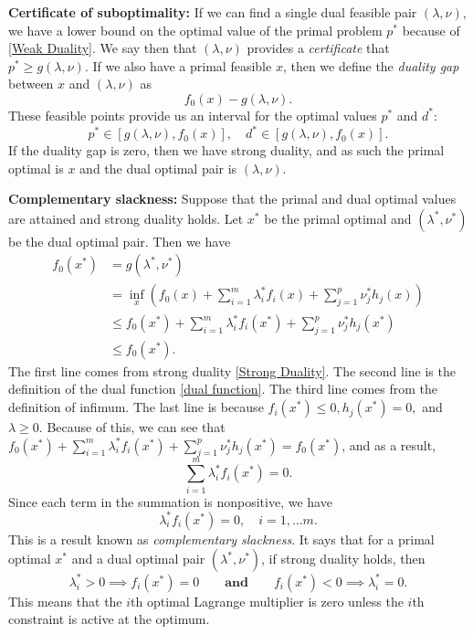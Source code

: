 	\textbf{Certificate of suboptimality:} If we can find a single dual feasible pair $(\lambda, \nu)$, we have a lower bound on the optimal value of the primal problem $p^*$ because of \eqref{Weak Duality}. We say then that $(\lambda, \nu)$ provides a \emph{certificate} that $p^* \geq g(\lambda, \nu)$. If we also have a primal feasible $x$, then we define the \emph{duality gap} between $x$ and $(\lambda, \nu)$ as
	$$
		f_0 (x) - g(\lambda, \nu).
	$$	
	These feasible points provide us an interval for the optimal values $p^*$ and $d^*$:
	$$
		p^* \in [g(\lambda, \nu), f_0 (x)], \quad d^* \in [g(\lambda, \nu), f_0 (x)].
	$$
	If the duality gap is zero, then we have strong duality, and as such the primal optimal is $x$ and the dual optimal pair is $(\lambda, \nu)$. 
	
	\textbf{Complementary slackness:} Suppose that the primal and dual optimal values are attained and strong duality holds. Let $x^*$ be the primal optimal and $(\lambda^*, \nu^*)$ be the dual optimal pair. Then we have 
	$$
	\begin{aligned}
		f_0 (x^*) &= g(\lambda^*, \nu^*)\\
		&= \inf_{x} \left( f_0 (x) + \sum_{i=1}^{m} \lambda_i^* f_i (x) + \sum_{j = 1}^{p} \nu_j^* h_j (x) \right)\\
		& \leq f_0 (x^*) + \sum_{i=1}^{m} \lambda_i^* f_i (x^*) + \sum_{j = 1}^{p} \nu_j^* h_j (x^*)\\
		& \leq f_0 (x^*).
	\end{aligned}
	$$
	The first line comes from strong duality \eqref{Strong Duality}. The second line is the definition of the dual function \eqref{dual function}. The third line comes from the definition of infimum. The last line is because $f_i (x^*) \leq 0, h_j (x^*) = 0, $ and $\lambda \geq  0$. Because of this, we can see that $f_0 (x^*) + \sum_{i=1}^{m} \lambda_i^* f_i (x^*) + \sum_{j = 1}^{p} \nu_j^* h_j (x^*) = f_0 (x^*)$, and as a result,
	$$
		\sum_{i=1}^{m} \lambda_i^* f_i (x^*) = 0.
	$$
	Since each term in the summation is nonpositive, we have
	\begin{equation} \label{Complementary Slackness}
		\lambda_i^* f_i (x^*) = 0, \quad i = 1, \dots m.
	\end{equation}
	This is a result known as \emph{complementary slackness}. It says that for a primal optimal $x^*$ and a dual optimal pair $(\lambda^*, \nu^*)$, if strong duality holds, then 
	$$
		\lambda_i^* > 0 \implies f_i (x^*) = 0 \qquad \textbf{and} \qquad f_i (x^*) < 0 \implies \lambda_i^* = 0. 
	$$
	This means that the $i$th optimal Lagrange multiplier is zero unless the $i$th constraint is active at the optimum.
	
